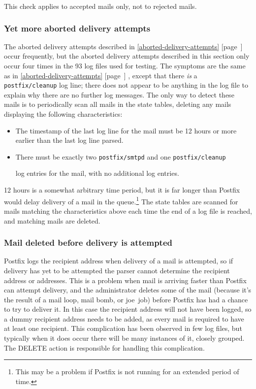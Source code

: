 \documentclass[a4paper,12pt,draft]{article}
\newcommand{\refwithpage}[1]{%
    \empty{}\ref{#1} [page~\pageref{#1}]%
}
\newcommand{\sectionref}[1]{%
    \textsection{}\refwithpage{#1}%
}
\newcommand{\daemon}[1]{%
    \texttt{postfix/#1}%
}
\newcommand{\numberOFlogFILES}[0]{%
    93%
}
\newcounter{dummy}
\begin{document}
This check applies to accepted mails only, not to rejected mails.

\subsubsection{Yet more aborted delivery attempts}

\label{yet-more-aborted-delivery-attempts}

The aborted delivery attempts described in
\sectionref{aborted-delivery-attempts} occur frequently, but the aborted
delivery attempts described in this section only occur four times in the
\numberOFlogFILES{} log files used for testing.  The symptoms are the same
as in \sectionref{aborted-delivery-attempts}, except that there
\textit{is\/} a \daemon{cleanup} log line; there does not appear to be
anything in the log file to explain why there are no further log messages.
The only way to detect these mails is to periodically scan all mails in the
state tables, deleting any mails displaying the following characteristics:

\begin{itemize}

    \item The timestamp of the last log line for the mail must be 12 hours
        or more earlier than the last log line parsed.

    \item There must be exactly two \daemon{smtpd} and one \daemon{cleanup}
        log entries for the mail, with no additional log entries.

\end{itemize}

12 hours is a somewhat arbitrary time period, but it is far longer than
Postfix would delay delivery of a mail in the queue.\footnote{This may be a
problem if Postfix is not running for an extended period of time.}  The
state tables are scanned for mails matching the characteristics above each
time the end of a log file is reached, and matching mails are deleted.

\subsubsection{Mail deleted before delivery is attempted}

\label{Mail deleted before delivery is attempted}

Postfix logs the recipient address when delivery of a mail is attempted, so
if delivery has yet to be attempted the parser cannot determine the
recipient address or addresses.  This is a problem when mail is arriving
faster than Postfix can attempt delivery, and the administrator deletes
some of the mail (because it's the result of a mail loop, mail bomb, or
joe~job) before Postfix has had a chance to try to deliver it.  In this
case the recipient address will not have been logged, so a dummy recipient
address needs to be added, as every mail is required to have at least one
recipient.  This complication has been observed in few log files, but
typically when it does occur there will be many instances of it, closely
grouped.  The DELETE action is responsible for handling this complication.
\end{document}
